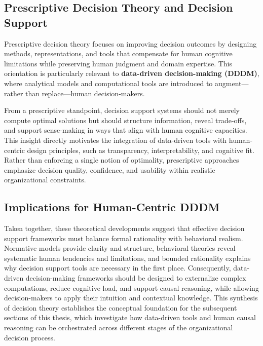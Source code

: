 \documentclass{sfuthesis}
\begin{document}
\subsection{Prescriptive Decision Theory and Decision Support}
Prescriptive decision theory focuses on improving decision outcomes by designing methods, representations, and tools that compensate for human cognitive limitations while preserving human judgment and domain expertise. This orientation is particularly relevant to \textbf{data-driven decision-making (DDDM)}, where analytical models and computational tools are introduced to augment—rather than replace—human decision-makers.\par
From a prescriptive standpoint, decision support systems should not merely compute optimal solutions but should structure information, reveal trade-offs, and support sense-making in ways that align with human cognitive capacities. This insight directly motivates the integration of data-driven tools with human-centric design principles, such as transparency, interpretability, and cognitive fit. Rather than enforcing a single notion of optimality, prescriptive approaches emphasize decision quality, confidence, and usability within realistic organizational constraints.
\subsection{Implications for Human-Centric DDDM}
Taken together, these theoretical developments suggest that effective decision support frameworks must balance formal rationality with behavioral realism. Normative models provide clarity and structure, behavioral theories reveal systematic human tendencies and limitations, and bounded rationality explains why decision support tools are necessary in the first place. Consequently, data-driven decision-making frameworks should be designed to externalize complex computations, reduce cognitive load, and support causal reasoning, while allowing decision-makers to apply their intuition and contextual knowledge. This synthesis of decision theory establishes the conceptual foundation for the subsequent sections of this thesis, which investigate how data-driven tools and human causal reasoning can be orchestrated across different stages of the organizational decision process.
\end{document}
